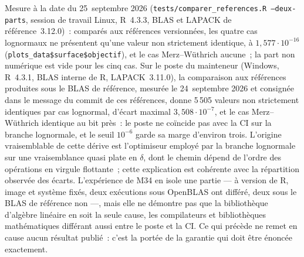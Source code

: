 \documentclass[a4paper,11pt]{article}
\newcommand{\code}[1]{\texttt{\small #1}}
\begin{document}
Mesure à la date du 25~septembre 2026 (\code{tests/comparer\_references.R --deux-parts}, session
de travail Linux, R~4.3.3, BLAS et LAPACK de référence~3.12.0)~: comparés aux références
versionnées, les quatre cas lognormaux ne présentent qu'une valeur non strictement identique,
à $1{,}577\cdot 10^{-16}$ (\code{plots\_data\$surface\$objectif}), et le cas Merz--Wüthrich
aucune~; la part non numérique est vide pour les cinq cas. Sur le poste du mainteneur (Windows,
R~4.3.1, BLAS interne de R, LAPACK~3.11.0), la comparaison aux références produites sous le BLAS
de référence, mesurée le 24~septembre 2026 et consignée dans le message du commit de ces
références, donne 5\,505 valeurs non strictement identiques par cas lognormal, d'écart maximal
$3{,}508\cdot 10^{-7}$, et le cas Merz--Wüthrich identique au bit près~: le poste ne coïncide pas
avec la CI sur la branche lognormale, et le seuil $10^{-6}$ garde sa marge d'environ trois.
L'origine vraisemblable de cette dérive est l'optimiseur employé
par la branche lognormale sur une vraisemblance quasi plate en $\delta$, dont le
chemin dépend de l'ordre des opérations en virgule flottante~; cette explication
est cohérente avec la répartition observée des écarts. L'expérience de M34 en isole une partie
--- à version de R, image et système fixés, deux exécutions sous OpenBLAS ont différé, deux sous
le BLAS de référence non ---, mais elle ne démontre pas que la bibliothèque d'algèbre linéaire
en soit la seule cause, les compilateurs et bibliothèques mathématiques différant aussi entre le
poste et la CI. Ce qui précède ne remet en cause aucun résultat publié~: c'est la
portée de la garantie qui doit être énoncée exactement.
\end{document}
